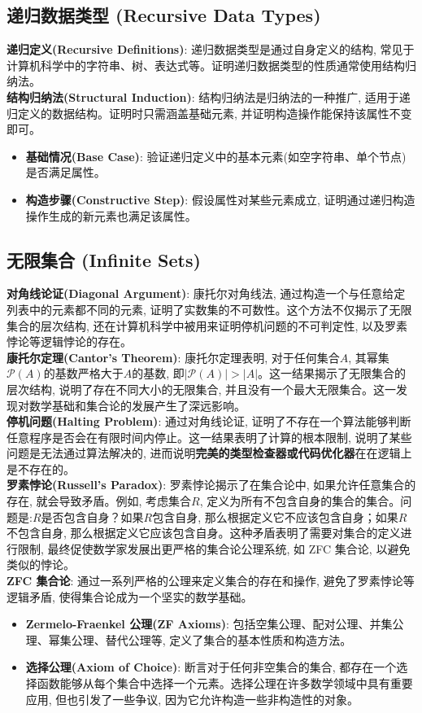 \documentclass[12pt, a4paper, UTF8]{ctexart}
\newcommand{\term}[1]{\textbf{\textcolor{blue!80!black}{#1}}}
\newcommand{\emphb}[1]{\textbf{#1}}
\begin{document}
\begin{sloppypar}
    \subsection{递归数据类型 (Recursive Data Types)}
    \emphb{递归定义(Recursive Definitions)}: 递归数据类型是通过自身定义的结构, 常见于计算机科学中的字符串、树、表达式等。证明递归数据类型的性质通常使用结构归纳法。\\
    \emphb{结构归纳法(Structural Induction)}: 结构归纳法是归纳法的一种推广, 适用于递归定义的数据结构。证明时只需涵盖基础元素, 并证明构造操作能保持该属性不变即可。
    \begin{itemize}[nosep]
        \item \emphb{基础情况(Base Case)}: 验证递归定义中的基本元素(如空字符串、单个节点)是否满足属性。
        \item \emphb{构造步骤(Constructive Step)}: 假设属性对某些元素成立, 证明通过递归构造操作生成的新元素也满足该属性。
    \end{itemize}

    \subsection{无限集合 (Infinite Sets)}
    \emphb{对角线论证(Diagonal Argument)}: 康托尔对角线法, 通过构造一个与任意给定列表中的元素都不同的元素, 证明了实数集的不可数性。这个方法不仅揭示了无限集合的层次结构, 还在计算机科学中被用来证明停机问题的不可判定性, 以及罗素悖论等逻辑悖论的存在。\\
    \emphb{康托尔定理(Cantor's Theorem)}: 康托尔定理表明, 对于任何集合$A$, 其幂集$\mathcal{P}(A)$的基数严格大于$A$的基数, 即$|\mathcal{P}(A)| > |A|$。这一结果揭示了无限集合的层次结构, 说明了存在不同大小的无限集合, 并且没有一个最大无限集合。这一发现对数学基础和集合论的发展产生了深远影响。\\
    \emphb{停机问题(Halting Problem)}: 通过对角线论证, 证明了不存在一个算法能够判断任意程序是否会在有限时间内停止。这一结果表明了计算的根本限制, 说明了某些问题是无法通过算法解决的, 进而说明\emphb{完美的类型检查器或代码优化器}在在逻辑上是不存在的。\\
    \emphb{罗素悖论(Russell's Paradox)}: 罗素悖论揭示了在集合论中, 如果允许任意集合的存在, 就会导致矛盾。例如, 考虑集合$R$, 定义为所有不包含自身的集合的集合。问题是:$R$是否包含自身？如果$R$包含自身, 那么根据定义它不应该包含自身；如果$R$不包含自身, 那么根据定义它应该包含自身。这种矛盾表明了需要对集合的定义进行限制, 最终促使数学家发展出更严格的集合论公理系统, 如 ZFC 集合论, 以避免类似的悖论。\\
    \emphb{ZFC 集合论}: 通过一系列严格的公理来定义集合的存在和操作, 避免了罗素悖论等逻辑矛盾, 使得集合论成为一个坚实的数学基础。
    \begin{itemize}[nosep]
        \item \term{Zermelo-Fraenkel 公理(ZF Axioms)}: 包括空集公理、配对公理、并集公理、幂集公理、替代公理等, 定义了集合的基本性质和构造方法。
        \item \term{选择公理(Axiom of Choice)}: 断言对于任何非空集合的集合, 都存在一个选择函数能够从每个集合中选择一个元素。选择公理在许多数学领域中具有重要应用, 但也引发了一些争议, 因为它允许构造一些非构造性的对象。
    \end{itemize}


\end{sloppypar}
\end{document}
